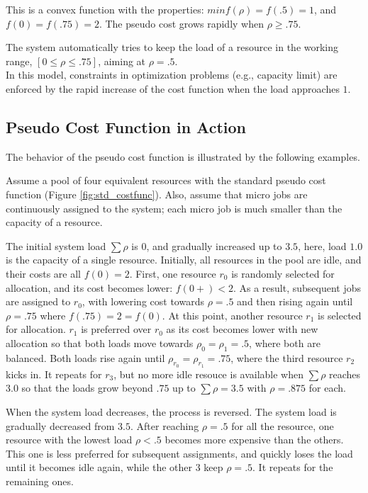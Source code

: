 This is a convex function with the properties:
$min f(\rho) = f(.5) = 1$, and $f(0) = f(.75) = 2$.
The pseudo cost grows rapidly when $\rho \ge .75$.

The system automatically tries to keep the load of a resource in the
working range, $[0 \le \rho \le .75]$, aiming at $\rho = .5$. \\

In this model, constraints in optimization problems (e.g.,
capacity limit) are enforced by the rapid increase of the cost function when
the load approaches $1$.

\subsection{Pseudo Cost Function in Action}

The behavior of the pseudo cost function is illustrated by the
following examples.

Assume a pool of four equivalent resources with the standard pseudo cost
function (Figure \ref{fig:std_costfunc}).
Also, assume that micro jobs are continuously assigned to the
system; each micro job is much smaller than the capacity of a
resource.

The initial system load $\sum \rho$ is $0$, and gradually increased
up to $3.5$, here, load $1.0$ is the capacity of a single resource.
Initially, all resources in the pool are idle, and their costs are
all $f(0)= 2$.
First, one resource $r_{0}$ is randomly selected for allocation, and its
cost becomes lower: $f(0+) < 2$. As a result, subsequent jobs are
assigned to $r_{0}$, with lowering cost towards $\rho = .5$ and then
rising again until $\rho = .75$ where $f(.75) = 2 = f(0)$.
At this point, another resource $r_{1}$ is selected for allocation.
$r_{1}$ is preferred over $r_{0}$ as its cost becomes lower with new
allocation so that both loads move towards $\rho_{0} = \rho_{1} = .5$,
where both are balanced.
Both loads rise again until $\rho_{r_{0}} = \rho_{r_{1}} = .75$,
where the third resource $r_{2}$ kicks in.
It repeats for $r_{3}$, but no more idle resouce is available
when $\sum \rho$ reaches $3.0$ so that the loads grow beyond $.75$
up to $\sum \rho = 3.5$ with $\rho = .875$ for each.

When the system load decreases, the process is reversed.
The system load is gradually decreased from $3.5$.
After reaching $\rho = .5$ for all the resource,
one resource with the lowest load $\rho < .5$ becomes more expensive
than the others.
This one is less preferred for subsequent assignments, and quickly
loses the load until it becomes idle again, while the other 3 keep
$\rho = .5$. It repeats for the remaining ones.

